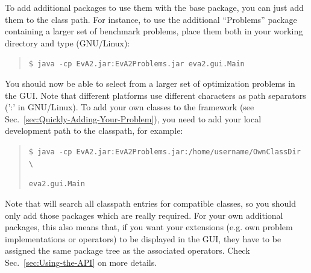 To add additional packages to use them with the  base package,
you can just add them to the class path. For instance, to use the
additional ``Problems'' package containing a larger set of benchmark
problems, place them both in your working directory and type (GNU/Linux):
\begin{quotation}
\texttt{\small \$ java -cp EvA2.jar:EvA2Problems.jar eva2.gui.Main}{\small \par}
\end{quotation}
You should now be able to select from a larger set of optimization
problems in the GUI. Note that different platforms use different characters
as path separators (':' in GNU/Linux). To add your own classes to
the  framework (see Sec.~\ref{sec:Quickly-Adding-Your-Problem}),
you need to add your local development path to the classpath, for
example:
\begin{quotation}
\texttt{\small \$ java -cp EvA2.jar:EvA2Problems.jar:/home/username/OwnClassDir
\textbackslash{}}{\small \par}

\texttt{\small eva2.gui.Main}{\small \par}
\end{quotation}
Note that  will search all classpath entries for compatible
classes, so you should only add those packages which are really required.
For your own additional packages, this also means that, if you want
your extensions (e.g. own problem implementations or operators) to
be displayed in the  GUI, they have to be assigned the
same package tree as the associated  operators. Check Sec.~\ref{sec:Using-the-API}
on more details.
